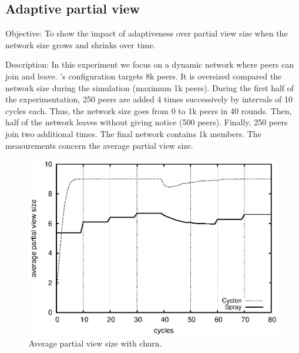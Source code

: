 \subsection{Adaptive partial view}

\begin{asparadesc}

\item[Objective:] To show the impact of adaptiveness over partial view size when
  the network size grows and shrinks over time.
\item[Description:] In this experiment we focus on a dynamic network where peers
  can join and leave.  \CYCLON's configuration targets 8k peers. It is
  oversized compared the network size during the simulation (maximum 1k
  peers). During the first half of the experimentation, 250 peers are added 4
  times successively by intervals of 10 cycles each. Thus, the network size goes
  from 0 to 1k peers in 40 rounds. Then, half of the network leaves without
  giving notice (500 peers). Finally, 250 peers join two additional times. The
  final network contains 1k members. The measurements concern the average
  partial view size.

\begin{figure}
  \centering
  \includegraphics[width=\SCALE\textwidth]{img/avgpv.eps}
  \caption{\label{fig:churn}Average partial view size with churn.}
\end{figure}


\end{asparadesc}
